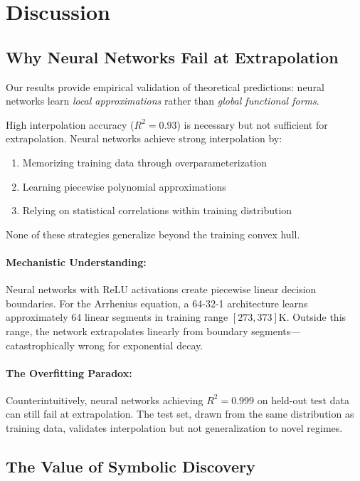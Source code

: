 \documentclass[twoside,11pt]{article}
\begin{document}
\section{Discussion}
\label{sec:discussion}

\subsection{Why Neural Networks Fail at Extrapolation}

Our results provide empirical validation of theoretical predictions: neural networks learn \emph{local approximations} rather than \emph{global functional forms}.

\begin{remark}
High interpolation accuracy ($R^2 = 0.93$) is necessary but not sufficient for extrapolation. Neural networks achieve strong interpolation by:
\begin{enumerate}
\item Memorizing training data through overparameterization
\item Learning piecewise polynomial approximations
\item Relying on statistical correlations within training distribution
\end{enumerate}
None of these strategies generalize beyond the training convex hull.
\end{remark}

\paragraph{Mechanistic Understanding:} Neural networks with ReLU activations create piecewise linear decision boundaries. For the Arrhenius equation, a 64-32-1 architecture learns approximately 64 linear segments in training range $[273, 373]$K. Outside this range, the network extrapolates linearly from boundary segments---catastrophically wrong for exponential decay.

\paragraph{The Overfitting Paradox:} Counterintuitively, neural networks achieving $R^2 = 0.999$ on held-out test data can still fail at extrapolation. The test set, drawn from the same distribution as training data, validates interpolation but not generalization to novel regimes.

\subsection{The Value of Symbolic Discovery}
\end{document}
